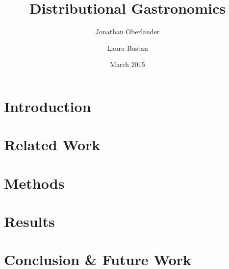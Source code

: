 \documentclass{llncs}
\title{Distributional Gastronomics}
\author{
    Jonathan Oberländer
    \and
    Laura Bostan
}
\institute{}
\date{March 2015}
\begin{document}
\maketitle

\begin{abstract}

\end{abstract}

\section{Introduction}


\section{Related Work}


\section{Methods}


\newpage
\section{Results}


\section{Conclusion \& Future Work}




\end{document}

